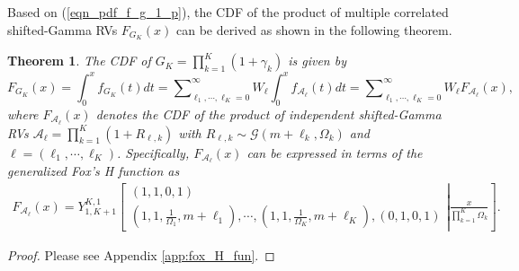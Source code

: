 \documentclass[12pt,onecolumn,draftcls]{IEEEtran}
\newcommand{\bs}{\boldsymbol}
\newtheorem{theorem}{Theorem}
\begin{document}
Based on (\ref{eqn_pdf_f_g_1_p}), the CDF of the product of multiple correlated shifted-Gamma RVs ${F_{ G_K}}\left( x \right)$ can be derived as shown in the following theorem.
\begin{theorem}\label{the:cdf_pdf_corr_gam_shif}
The CDF of $G_K = \prod\nolimits_{k = 1}^K {\left( {1 + {\gamma _k}} \right)}$ is given by
\begin{equation}\label{eqn:CDF_G_def_sec}
{F_{ G_K}}\left( x \right) = \int\nolimits_0^x {{f_{ G_K}}\left( t \right)dt}  %
=\sum\nolimits_{{\ell_1}, \cdots ,{\ell_K} = 0}^\infty  {{W_{\bs{\ell}}}\int\nolimits_0^x {{f_{{{ {\mathcal A}}_{\bs{\ell}}}}}(t)dt}}
= \sum\nolimits_{{\ell_1}, \cdots ,{\ell_K} = 0}^\infty  {{W_{\bs{\ell}}}{F_{{{ {\mathcal A}}_{\bs{\ell}}}}}(x)},
\end{equation}
where ${{F_{{{ {\mathcal A}}_{\bs{\ell}}}}}(x)}$ denotes the CDF of the product of independent shifted-Gamma RVs $\mathcal A_{\bs{\ell}} = \prod\nolimits_{k = 1}^K (1+R_{{\bs{\ell}},k})$ with $R_{{\bs{\ell}},k} \sim \mathcal {G}(m+\ell_k,{\Omega _k})$ and ${{\bs{\ell}}} = (\ell_1,\cdots,\ell_K)$. Specifically, ${{F_{{{ {\mathcal A}}_{\bs{\ell}}}}}(x)}$ can be expressed in terms of the generalized Fox's H function as
\begin{multline}\label{eqn:CDF_F_A_def_sec}
{F_{{{ {\mathcal A}}_{\bs{\ell}}}}}(x) = Y_{1,K + 1}^{K,1}\left[ {\left. {\begin{array}{*{20}{c}}
{\left( {1,1,0,1} \right)}  \\
{\left( {1,1,\frac{1}{{{\Omega _1}}},m + {\ell_1}} \right), \cdots ,\left( {1,1,\frac{1}{{{\Omega _K}}},m + {\ell_K}} \right),\left( {0,1,0,1} \right)}
\end{array}} \right|\frac{x}{{\prod\nolimits_{k = 1}^K {{\Omega _k}} }}} \right].
\end{multline}
\end{theorem}
\begin{proof}
Please see Appendix \ref{app:fox_H_fun}.

\end{proof}
\end{document}
